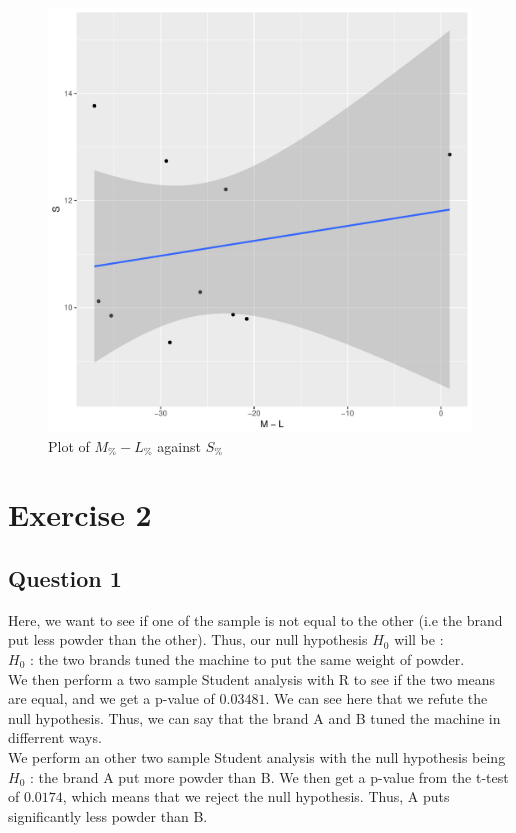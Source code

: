 \documentclass[12pt,a4paper]{article}
\begin{document}
\begin{figure}
  \begin{center}
    \includegraphics[width=0.6\linewidth]{corr2.pdf}
    \caption{Plot of $M_\% - L_\%$ against $S_\%$}
    \label{corr2}
  \end{center}
\end{figure}


\section*{Exercise 2}
\subsection*{Question 1}
Here, we want to see if one of the sample is not equal to the other (i.e the brand put less powder than the other). Thus, our null hypothesis $H_0$ will be :\\
$H_0$ : the two brands tuned the machine to put the same weight of powder.\\
We then perform a two sample Student analysis with R to see if the two means are equal, and we get a p-value of $0.03481$. We can see here that we refute the null hypothesis. Thus, we can say that the brand A and B tuned the machine in differrent ways.\\
We perform an other two sample Student analysis with the null hypothesis being $H_0$ : the brand A put more powder than B. We then get a p-value from the t-test of $0.0174$, which means that we reject the null hypothesis. Thus, A puts significantly less powder than B.
\end{document}
